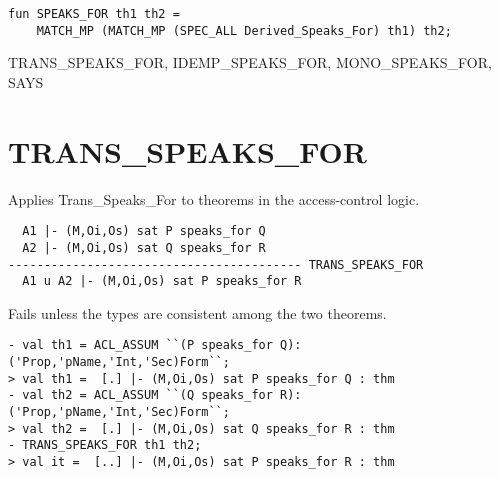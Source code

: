 \IMPLEMENTATION
\begin{holboxed}
\begin{verbatim}
fun SPEAKS_FOR th1 th2 =
    MATCH_MP (MATCH_MP (SPEC_ALL Derived_Speaks_For) th1) th2;
\end{verbatim}
\end{holboxed}

\SEEALSO
TRANS\_SPEAKS\_FOR, IDEMP\_SPEAKS\_FOR, MONO\_SPEAKS\_FOR, SAYS
\ENDDOC

\section{TRANS\_SPEAKS\_FOR}



\egroup

\SYNOPSIS
Applies Trans\_Speaks\_For to theorems in the access-control logic.

\DESCRIBE
\begin{verbatim}
  A1 |- (M,Oi,Os) sat P speaks_for Q
  A2 |- (M,Oi,Os) sat Q speaks_for R
----------------------------------------- TRANS_SPEAKS_FOR
  A1 u A2 |- (M,Oi,Os) sat P speaks_for R
\end{verbatim}

\FAILURE 
Fails unless the types are consistent among the two
theorems.

\EXAMPLE

\begin{holboxed}
  \begin{scriptsize}
\begin{verbatim}
- val th1 = ACL_ASSUM ``(P speaks_for Q):('Prop,'pName,'Int,'Sec)Form``;
> val th1 =  [.] |- (M,Oi,Os) sat P speaks_for Q : thm
- val th2 = ACL_ASSUM ``(Q speaks_for R):('Prop,'pName,'Int,'Sec)Form``;
> val th2 =  [.] |- (M,Oi,Os) sat Q speaks_for R : thm
- TRANS_SPEAKS_FOR th1 th2;
> val it =  [..] |- (M,Oi,Os) sat P speaks_for R : thm
\end{verbatim}
  \end{scriptsize}

\end{holboxed}

